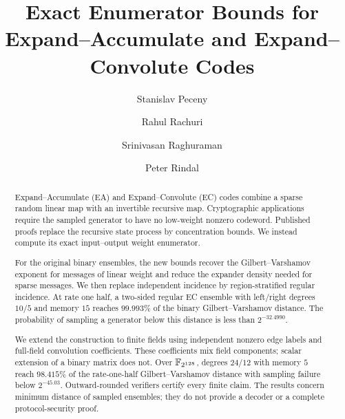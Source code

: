 \documentclass[11pt]{article}
\title{Exact Enumerator Bounds for Expand--Accumulate and
Expand--Convolute Codes}
\author{Stanislav Peceny \and Rahul Rachuri \and
Srinivasan Raghuraman \and Peter Rindal}
\date{}
\begin{document}
\maketitle

\begin{abstract}
Expand--Accumulate (EA) and Expand--Convolute (EC) codes combine a sparse
random linear map with an invertible recursive map.  Cryptographic
applications require the sampled generator to have no low-weight nonzero
codeword.  Published proofs replace the recursive state process by
concentration bounds.  We instead compute its exact input--output weight
enumerator.

For the original binary ensembles, the new bounds recover the
Gilbert--Varshamov exponent for messages of linear weight and reduce the
expander density needed for sparse messages.  We then replace independent
incidence by region-stratified regular incidence.  At rate one half, a
two-sided regular EC ensemble with left/right degrees $10/5$ and memory $15$
reaches $99.993\%$ of the binary Gilbert--Varshamov distance.  The probability
of sampling a generator below this distance is less than $2^{-32.4990}$.

We extend the construction to finite fields using independent nonzero edge
labels and full-field convolution coefficients.  These coefficients mix
field components; scalar extension of a binary matrix does not.  Over
$\mathbb F_{2^{128}}$, degrees $24/12$ with memory $5$ reach $98.415\%$ of the
rate-one-half Gilbert--Varshamov distance with sampling failure below
$2^{-45.03}$.  Outward-rounded verifiers certify every finite claim.  The
results concern minimum distance of sampled ensembles; they do not provide a
decoder or a complete protocol-security proof.
\end{abstract}











\appendix







\end{document}
